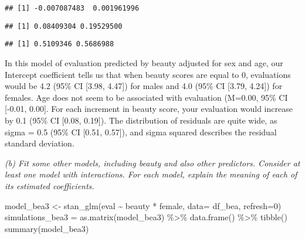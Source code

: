 \documentclass[
]{article}
\newenvironment{Shaded}{\begin{snugshade}}{\end{snugshade}}
\newcommand{\AttributeTok}[1]{\textcolor[rgb]{0.77,0.63,0.00}{#1}}
\newcommand{\DecValTok}[1]{\textcolor[rgb]{0.00,0.00,0.81}{#1}}
\newcommand{\FunctionTok}[1]{\textcolor[rgb]{0.00,0.00,0.00}{#1}}
\newcommand{\NormalTok}[1]{#1}
\newcommand{\OtherTok}[1]{\textcolor[rgb]{0.56,0.35,0.01}{#1}}
\newcommand{\SpecialCharTok}[1]{\textcolor[rgb]{0.00,0.00,0.00}{#1}}
\begin{document}
\begin{verbatim}
## [1] -0.007087483  0.001961996
\end{verbatim}

\begin{Shaded}
\end{Shaded}

\begin{verbatim}
## [1] 0.08409304 0.19529500
\end{verbatim}

\begin{Shaded}
\end{Shaded}

\begin{verbatim}
## [1] 0.5109346 0.5686988
\end{verbatim}

In this model of evaluation predicted by beauty adjusted for sex and
age, our Intercept coefficient tells us that when beauty scores are
equal to 0, evaluations would be 4.2 (95\% CI {[}3.98, 4.47{]}) for
males and 4.0 (95\% CI {[}3.79, 4.24{]}) for females. Age does not seem
to be associated with evaluation (M=0.00, 95\% CI {[}-0.01, 0.00{]}. For
each increment in beauty score, your evaluation would increase by 0.1
(95\% CI {[}0.08, 0.19{]}). The distribution of residuals are quite
wide, as sigma = 0.5 (95\% CI {[}0.51, 0.57{]}), and sigma squared
describes the residual standard deviation.

\emph{(b) Fit some other models, including beauty and also other
predictors. Consider at least one model with interactions. For each
model, explain the meaning of each of its estimated coefficients.}

\begin{Shaded}
\begin{Highlighting}[]
\NormalTok{model\_bea3 }\OtherTok{\textless{}{-}} \FunctionTok{stan\_glm}\NormalTok{(eval }\SpecialCharTok{\textasciitilde{}}\NormalTok{ beauty }\SpecialCharTok{*}\NormalTok{ female, }\AttributeTok{data=}\NormalTok{ df\_bea, }\AttributeTok{refresh=}\DecValTok{0}\NormalTok{)}
\NormalTok{simulations\_bea3 }\OtherTok{=} \FunctionTok{as.matrix}\NormalTok{(model\_bea3) }\SpecialCharTok{\%\textgreater{}\%} \FunctionTok{data.frame}\NormalTok{() }\SpecialCharTok{\%\textgreater{}\%} \FunctionTok{tibble}\NormalTok{()}
\FunctionTok{summary}\NormalTok{(model\_bea3)}
\end{Highlighting}
\end{Shaded}
\end{document}
